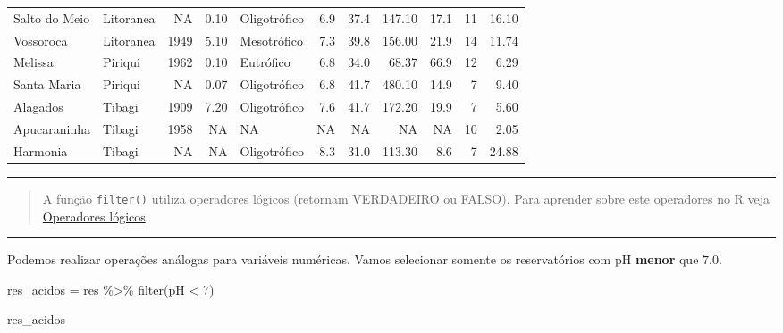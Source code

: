 \documentclass[
]{book}
\newenvironment{Shaded}{\begin{snugshade}}{\end{snugshade}}
\newcommand{\DecValTok}[1]{\textcolor[rgb]{0.00,0.00,0.81}{#1}}
\newcommand{\FunctionTok}[1]{\textcolor[rgb]{0.00,0.00,0.00}{#1}}
\newcommand{\NormalTok}[1]{#1}
\newcommand{\OtherTok}[1]{\textcolor[rgb]{0.56,0.35,0.01}{#1}}
\newcommand{\SpecialCharTok}[1]{\textcolor[rgb]{0.00,0.00,0.00}{#1}}
\begin{document}
\begin{table}
\begin{tabular}{llrrlrrrrrr}
Salto do Meio & Litoranea & NA & 0.10 & Oligotrófico & 6.9 & 37.4 & 147.10 & 17.1 & 11 & 16.10\\
Vossoroca & Litoranea & 1949 & 5.10 & Mesotrófico & 7.3 & 39.8 & 156.00 & 21.9 & 14 & 11.74\\
Melissa & Piriqui & 1962 & 0.10 & Eutrófico & 6.8 & 34.0 & 68.37 & 66.9 & 12 & 6.29\\
\addlinespace
Santa Maria & Piriqui & NA & 0.07 & Oligotrófico & 6.8 & 41.7 & 480.10 & 14.9 & 7 & 9.40\\
Alagados & Tibagi & 1909 & 7.20 & Oligotrófico & 7.6 & 41.7 & 172.20 & 19.9 & 7 & 5.60\\
Apucaraninha & Tibagi & 1958 & NA & NA & NA & NA & NA & NA & 10 & 2.05\\
Harmonia & Tibagi & NA & NA & Oligotrófico & 8.3 & 31.0 & 113.30 & 8.6 & 7 & 24.88\\
\bottomrule
\end{tabular}
\endgroup{}
\end{table}

\begin{center}\rule{0.5\linewidth}{0.5pt}\end{center}

\begin{quote}
A função \texttt{filter()} utiliza operadores lógicos (retornam VERDADEIRO ou FALSO). Para aprender sobre este operadores no R veja \href{https://fcopf.github.io/probest-introR/intro.html\#operadores-l\%C3\%B3gicos}{Operadores lógicos}
\end{quote}

\begin{center}\rule{0.5\linewidth}{0.5pt}\end{center}

Podemos realizar operações análogas para variáveis numéricas. Vamos selecionar somente os reservatórios com pH \textbf{menor} que \(7.0\).

\begin{Shaded}
\begin{Highlighting}[]
\NormalTok{res\_acidos }\OtherTok{=}\NormalTok{ res }\SpecialCharTok{\%\textgreater{}\%} 
  \FunctionTok{filter}\NormalTok{(pH }\SpecialCharTok{\textless{}} \DecValTok{7}\NormalTok{)}

\NormalTok{res\_acidos}
\end{Highlighting}
\end{Shaded}
\end{document}
